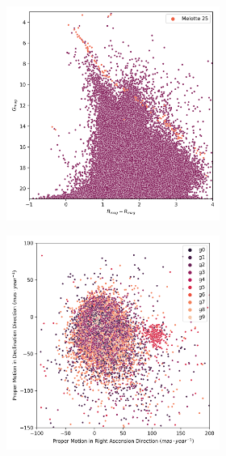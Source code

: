 \documentclass[11pt, a4paper, english]{book}
\begin{document}
\begin{figure}[H]
\begin{subfigure}{0.9\textwidth}
\begin{subfigure}[t]{0.30\textwidth}
    \end{subfigure}
    \hfill
    \begin{subfigure}[t]{0.30\textwidth}
      \centering
      \includegraphics[width=\textwidth]{../figures/melotte_25/hr_diagram_melotte_25.png}
    \end{subfigure}
  \end{subfigure}
  \caption{Melotte 25 Clusterix+TOPCAT characterization.}
  \centering
  \begin{subfigure}{0.9\textwidth}
    \centering
    \begin{subfigure}[t]{0.30\textwidth}
      \centering
      \includegraphics[width=\textwidth]{../figures/melotte_25/kmeans_pm_melotte_25.png}

\end{subfigure}
\end{subfigure}
\end{figure}
\end{document}
